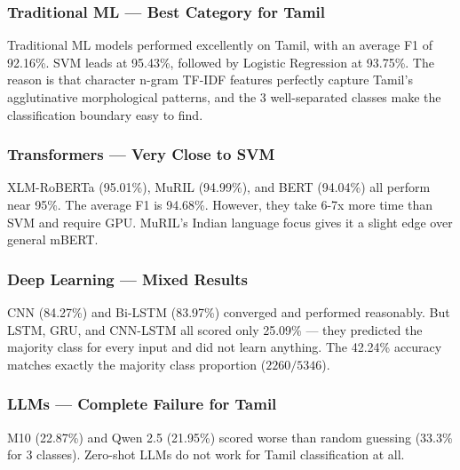 \documentclass[conference]{IEEEtran}
\begin{document}
\subsubsection{Traditional ML --- Best Category for Tamil}
Traditional ML models performed excellently on Tamil, with an average F1 of 92.16\%. SVM leads at 95.43\%, followed by Logistic Regression at 93.75\%. The reason is that character n-gram TF-IDF features perfectly capture Tamil's agglutinative morphological patterns, and the 3 well-separated classes make the classification boundary easy to find.

\subsubsection{Transformers --- Very Close to SVM}
XLM-RoBERTa (95.01\%), MuRIL (94.99\%), and BERT (94.04\%) all perform near 95\%. The average F1 is 94.68\%. However, they take 6-7x more time than SVM and require GPU. MuRIL's Indian language focus gives it a slight edge over general mBERT.

\subsubsection{Deep Learning --- Mixed Results}
CNN (84.27\%) and Bi-LSTM (83.97\%) converged and performed reasonably. But LSTM, GRU, and CNN-LSTM all scored only 25.09\% --- they predicted the majority class for every input and did not learn anything. The 42.24\% accuracy matches exactly the majority class proportion ($2260/5346$).

\subsubsection{LLMs --- Complete Failure for Tamil}
M10 (22.87\%) and Qwen 2.5 (21.95\%) scored worse than random guessing (33.3\% for 3 classes). Zero-shot LLMs do not work for Tamil classification at all.
\end{document}

